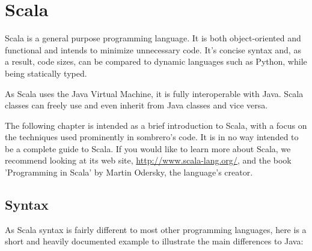 \section{Scala}

Scala is a general purpose programming language. It is both object-oriented and functional and intends to minimize unnecessary code. It's concise syntax and, as a result, code sizes, can be compared to dynamic languages such as Python, while being statically typed.

As Scala uses the Java Virtual Machine, it is fully interoperable with Java. Scala classes can freely use and even inherit from Java classes and vice versa.

The following chapter is intended as a brief introduction to Scala, with a focus on the techniques used prominently in sombrero's code. It is in no way intended to be a complete guide to Scala. If you would like to learn more about Scala, we recommend looking at its web site, \url{http://www.scala-lang.org/}, and the book 'Programming in Scala' by Martin Odersky, the language's creator.

\subsection{Syntax}

As Scala syntax is fairly different to most other programming languages, here is a short and heavily documented example to illustrate the main differences to Java:

